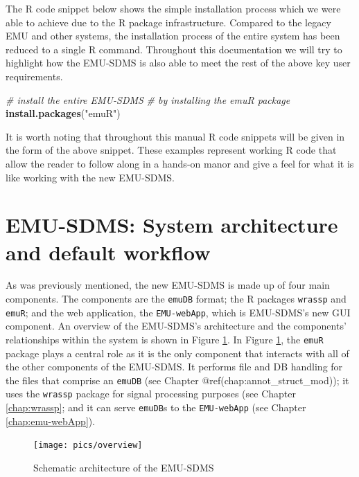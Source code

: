 \documentclass[]{book}
\newenvironment{Shaded}{\begin{snugshade}}{\end{snugshade}}
\newcommand{\CommentTok}[1]{\textcolor[rgb]{0.56,0.35,0.01}{\textit{#1}}}
\newcommand{\KeywordTok}[1]{\textcolor[rgb]{0.13,0.29,0.53}{\textbf{#1}}}
\newcommand{\NormalTok}[1]{#1}
\newcommand{\StringTok}[1]{\textcolor[rgb]{0.31,0.60,0.02}{#1}}
\begin{document}
The R code snippet below shows the simple installation process which we were able to achieve due to the R package infrastructure. Compared to the legacy EMU and other systems, the installation process of the entire system has been reduced to a single R command. Throughout this documentation we will try to highlight how the EMU-SDMS is also able to meet the rest of the above key user requirements.

\begin{Shaded}
\begin{Highlighting}[]
\CommentTok{# install the entire EMU-SDMS}
\CommentTok{# by installing the emuR package}
\KeywordTok{install.packages}\NormalTok{(}\StringTok{"emuR"}\NormalTok{)}
\end{Highlighting}
\end{Shaded}

It is worth noting that throughout this manual R code snippets will be given in the form of the above snippet. These examples represent working R code that allow the reader to follow along in a hands-on manor and give a feel for what it is like working with the new EMU-SDMS.

\hypertarget{sec:overview-sysArch}{%
\section{EMU-SDMS: System architecture and default workflow}\label{sec:overview-sysArch}}

As was previously mentioned, the new EMU-SDMS is made up of four main components. The components are the \texttt{emuDB} format; the R packages \texttt{wrassp} and \texttt{emuR}; and the web application, the \texttt{EMU-webApp}, which is EMU-SDMS's new GUI component. An overview of the EMU-SDMS's architecture and the components' relationships within the system is shown in Figure \ref{fig:overview-archOver}. In Figure \ref{fig:overview-archOver}, the \texttt{emuR} package plays a central role as it is the only component that interacts with all of the other components of the EMU-SDMS. It performs file and DB handling for the files that comprise an \texttt{emuDB} (see Chapter @ref(chap:annot\_struct\_mod)); it uses the \texttt{wrassp} package for signal processing purposes (see Chapter \ref{chap:wrassp}; and it can serve \texttt{emuDB}s to the \texttt{EMU-webApp} (see Chapter \ref{chap:emu-webApp}).

\begin{figure}

{\centering \texttt{[image: pics/overview]} 

}

\caption{Schematic architecture of the EMU-SDMS}\label{fig:overview-archOver}
\end{figure}
\end{document}
